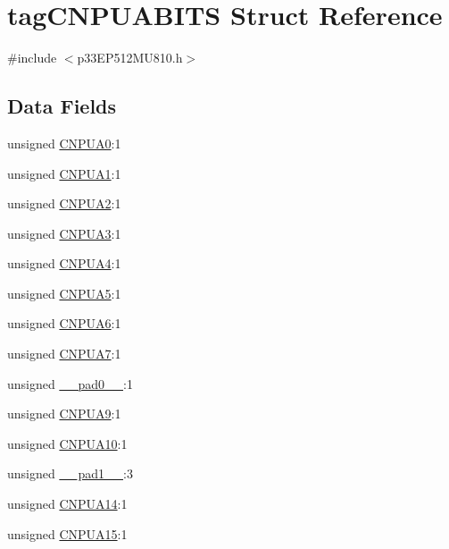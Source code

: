 \hypertarget{structtag_c_n_p_u_a_b_i_t_s}{}\section{tag\+C\+N\+P\+U\+A\+B\+I\+TS Struct Reference}
\label{structtag_c_n_p_u_a_b_i_t_s}


{\ttfamily \#include $<$p33\+E\+P512\+M\+U810.\+h$>$}

\subsection*{Data Fields}
\begin{DoxyCompactItemize}
\item 
unsigned \hyperlink{structtag_c_n_p_u_a_b_i_t_s_a943e5c1eeea700cbe3fa08993ff24c7c}{C\+N\+P\+U\+A0}\+:1
\item 
unsigned \hyperlink{structtag_c_n_p_u_a_b_i_t_s_ae421ae74e45f3f996c9536e91781e6d4}{C\+N\+P\+U\+A1}\+:1
\item 
unsigned \hyperlink{structtag_c_n_p_u_a_b_i_t_s_aaff1dafec9326d967a93236b1b1c7d7a}{C\+N\+P\+U\+A2}\+:1
\item 
unsigned \hyperlink{structtag_c_n_p_u_a_b_i_t_s_a68010595d7e7d186f3e081d26a4e8ed7}{C\+N\+P\+U\+A3}\+:1
\item 
unsigned \hyperlink{structtag_c_n_p_u_a_b_i_t_s_a65e377bccfdafd04ea96e5badbb8c4ec}{C\+N\+P\+U\+A4}\+:1
\item 
unsigned \hyperlink{structtag_c_n_p_u_a_b_i_t_s_aa5a909dc65ff7c929bf6943fe567a6ca}{C\+N\+P\+U\+A5}\+:1
\item 
unsigned \hyperlink{structtag_c_n_p_u_a_b_i_t_s_a934401cdf048c3b39e8d77652d1215f9}{C\+N\+P\+U\+A6}\+:1
\item 
unsigned \hyperlink{structtag_c_n_p_u_a_b_i_t_s_a74504c81322646653a915908f2c7488d}{C\+N\+P\+U\+A7}\+:1
\item 
unsigned \hyperlink{structtag_c_n_p_u_a_b_i_t_s_adf71f3d8410c1f1dbbc96680a92c49af}{\+\_\+\+\_\+pad0\+\_\+\+\_\+}\+:1
\item 
unsigned \hyperlink{structtag_c_n_p_u_a_b_i_t_s_af93794815b239983326794054916ee7a}{C\+N\+P\+U\+A9}\+:1
\item 
unsigned \hyperlink{structtag_c_n_p_u_a_b_i_t_s_a80de0fb399147a527c33e200d89d3330}{C\+N\+P\+U\+A10}\+:1
\item 
unsigned \hyperlink{structtag_c_n_p_u_a_b_i_t_s_acaf2d0924a107ec6e8d2e31febaf66f9}{\+\_\+\+\_\+pad1\+\_\+\+\_\+}\+:3
\item 
unsigned \hyperlink{structtag_c_n_p_u_a_b_i_t_s_a03c9a913575cf0523b8640b428814d98}{C\+N\+P\+U\+A14}\+:1
\item 
unsigned \hyperlink{structtag_c_n_p_u_a_b_i_t_s_a1d2dd791a9f3c9bf1f2172dbd877e6c1}{C\+N\+P\+U\+A15}\+:1
\end{DoxyCompactItemize}


